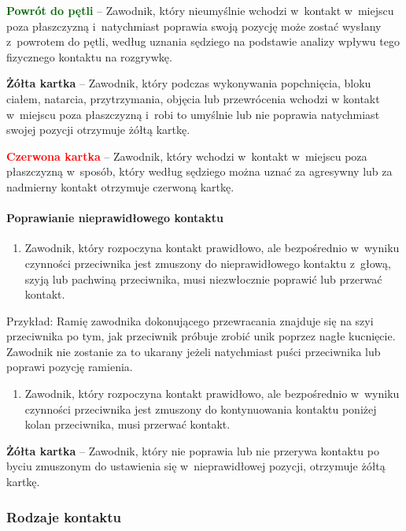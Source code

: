 \documentclass[12pt]{article}
\newcommand\redcard[1]{\bgroup\textcolor{red}{\textbf{#1}}}
\newcommand\yellowcard[1]{\bgroup\textcolor{darkyellow}{\textbf{#1}}}
\newcommand\other[1]{\bgroup\textcolor{darkgreen}{\textbf{#1}}}
\begin{document}
\other{Powrót do pętli} -- Zawodnik, który nieumyślnie wchodzi w~kontakt w~miejscu poza płaszczyzną i~natychmiast poprawia swoją pozycję może
zostać wysłany z~powrotem do pętli, według uznania sędziego na podstawie
analizy wpływu tego fizycznego kontaktu na rozgrywkę.

\yellowcard{Żółta kartka} -- Zawodnik, który podczas wykonywania popchnięcia,
bloku ciałem, natarcia, przytrzymania, objęcia lub przewrócenia wchodzi
w kontakt w~miejscu poza płaszczyzną i~robi to umyślnie lub nie poprawia
natychmiast swojej pozycji otrzymuje żółtą kartkę.

\redcard{Czerwona kartka} -- Zawodnik, który wchodzi w~kontakt w~miejscu
poza płaszczyzną w~sposób, który według sędziego można uznać za
agresywny lub za nadmierny kontakt otrzymuje czerwoną kartkę.

\paragraph{Poprawianie nieprawidłowego kontaktu}

\begin{enumerate}
	\item
	      Zawodnik, który rozpoczyna kontakt prawidłowo, ale bezpośrednio w~wyniku czynności przeciwnika jest zmuszony do nieprawidłowego kontaktu
	      z~głową, szyją lub pachwiną przeciwnika, musi niezwłocznie poprawić
	      lub przerwać kontakt.
\end{enumerate}

Przykład: Ramię zawodnika dokonującego przewracania
znajduje się na szyi przeciwnika po tym, jak przeciwnik próbuje zrobić
unik poprzez nagłe kucnięcie. Zawodnik nie zostanie za to ukarany jeżeli
natychmiast puści przeciwnika lub poprawi pozycję ramienia.

\begin{enumerate}[resume]
	\item
	      Zawodnik, który rozpoczyna kontakt prawidłowo, ale bezpośrednio w~wyniku czynności przeciwnika jest zmuszony do kontynuowania kontaktu
	      poniżej kolan przeciwnika, musi przerwać kontakt.
\end{enumerate}

\yellowcard{Żółta kartka} -- Zawodnik, który nie poprawia lub nie przerywa
kontaktu po byciu zmuszonym do ustawienia się w~nieprawidłowej pozycji,
otrzymuje żółtą kartkę.

\subsubsection{Rodzaje kontaktu}
\end{document}

